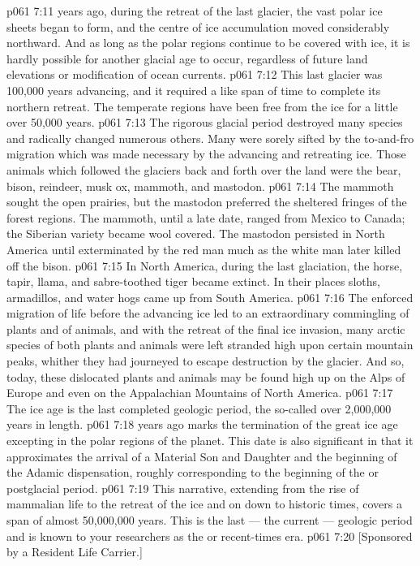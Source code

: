 \vs p061 7:11 \pc {} years ago, during the retreat of the last glacier, the vast polar ice sheets began to form, and the centre of ice accumulation moved considerably northward. And as long as the polar regions continue to be covered with ice, it is hardly possible for another glacial age to occur, regardless of future land elevations or modification of ocean currents.
\vs p061 7:12 This last glacier was 100,000 years advancing, and it required a like span of time to complete its northern retreat. The temperate regions have been free from the ice for a little over 50,000 years.
\vs p061 7:13 The rigorous glacial period destroyed many species and radically changed numerous others. Many were sorely sifted by the to\hyp{}and\hyp{}fro migration which was made necessary by the advancing and retreating ice. Those animals which followed the glaciers back and forth over the land were the bear, bison, reindeer, musk ox, mammoth, and mastodon.
\vs p061 7:14 The mammoth sought the open prairies, but the mastodon preferred the sheltered fringes of the forest regions. The mammoth, until a late date, ranged from Mexico to Canada; the Siberian variety became wool covered. The mastodon persisted in North America until exterminated by the red man much as the white man later killed off the bison.
\vs p061 7:15 In North America, during the last glaciation, the horse, tapir, llama, and sabre\hyp{}toothed tiger became extinct. In their places sloths, armadillos, and water hogs came up from South America.
\vs p061 7:16 The enforced migration of life before the advancing ice led to an extraordinary commingling of plants and of animals, and with the retreat of the final ice invasion, many arctic species of both plants and animals were left stranded high upon certain mountain peaks, whither they had journeyed to escape destruction by the glacier. And so, today, these dislocated plants and animals may be found high up on the Alps of Europe and even on the Appalachian Mountains of North America.
\vs p061 7:17 \pc The ice age is the last completed geologic period, the so\hyp{}called  over 2,000,000 years in length.
\vs p061 7:18 \pc {} years ago marks the termination of the great ice age excepting in the polar regions of the planet. This date is also significant in that it approximates the arrival of a Material Son and Daughter and the beginning of the Adamic dispensation, roughly corresponding to the beginning of the  or postglacial period.
\vs p061 7:19 \pc This narrative, extending from the rise of mammalian life to the retreat of the ice and on down to historic times, covers a span of almost 50,000,000 years. This is the last --- the current --- geologic period and is known to your researchers as the  or recent\hyp{}times era.
\vsetoff
\vs p061 7:20 [Sponsored by a Resident Life Carrier.]
\quizlink

